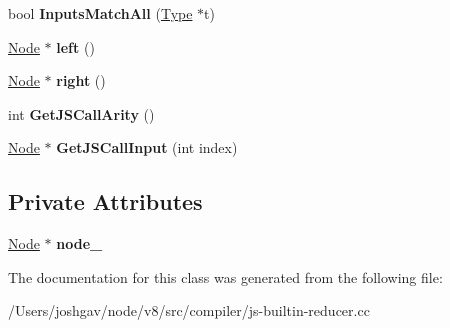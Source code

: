 \begin{DoxyCompactItemize}
\item 
bool {\bfseries Inputs\+Match\+All} (\hyperlink{classv8_1_1internal_1_1_type}{Type} $\ast$t)\hypertarget{classv8_1_1internal_1_1compiler_1_1_j_s_call_reduction_a5d3666b00c4cb13ef3d1726975b9361f}{}\label{classv8_1_1internal_1_1compiler_1_1_j_s_call_reduction_a5d3666b00c4cb13ef3d1726975b9361f}

\item 
\hyperlink{classv8_1_1internal_1_1compiler_1_1_node}{Node} $\ast$ {\bfseries left} ()\hypertarget{classv8_1_1internal_1_1compiler_1_1_j_s_call_reduction_a398d9b6b4e98cda8c8016760bd45c36d}{}\label{classv8_1_1internal_1_1compiler_1_1_j_s_call_reduction_a398d9b6b4e98cda8c8016760bd45c36d}

\item 
\hyperlink{classv8_1_1internal_1_1compiler_1_1_node}{Node} $\ast$ {\bfseries right} ()\hypertarget{classv8_1_1internal_1_1compiler_1_1_j_s_call_reduction_ae74074c22e24f6a5e597a55a5df9ac7f}{}\label{classv8_1_1internal_1_1compiler_1_1_j_s_call_reduction_ae74074c22e24f6a5e597a55a5df9ac7f}

\item 
int {\bfseries Get\+J\+S\+Call\+Arity} ()\hypertarget{classv8_1_1internal_1_1compiler_1_1_j_s_call_reduction_a1068ca02bbc13b802977a429cf82c841}{}\label{classv8_1_1internal_1_1compiler_1_1_j_s_call_reduction_a1068ca02bbc13b802977a429cf82c841}

\item 
\hyperlink{classv8_1_1internal_1_1compiler_1_1_node}{Node} $\ast$ {\bfseries Get\+J\+S\+Call\+Input} (int index)\hypertarget{classv8_1_1internal_1_1compiler_1_1_j_s_call_reduction_acbd17cd9aa0d9885c4bc8efcc85fdfdc}{}\label{classv8_1_1internal_1_1compiler_1_1_j_s_call_reduction_acbd17cd9aa0d9885c4bc8efcc85fdfdc}

\end{DoxyCompactItemize}
\subsection*{Private Attributes}
\begin{DoxyCompactItemize}
\item 
\hyperlink{classv8_1_1internal_1_1compiler_1_1_node}{Node} $\ast$ {\bfseries node\+\_\+}\hypertarget{classv8_1_1internal_1_1compiler_1_1_j_s_call_reduction_aca10f4114f9b3fcd9e2440c2b3d8ad86}{}\label{classv8_1_1internal_1_1compiler_1_1_j_s_call_reduction_aca10f4114f9b3fcd9e2440c2b3d8ad86}

\end{DoxyCompactItemize}


The documentation for this class was generated from the following file\+:\begin{DoxyCompactItemize}
\item 
/\+Users/joshgav/node/v8/src/compiler/js-\/builtin-\/reducer.\+cc\end{DoxyCompactItemize}
